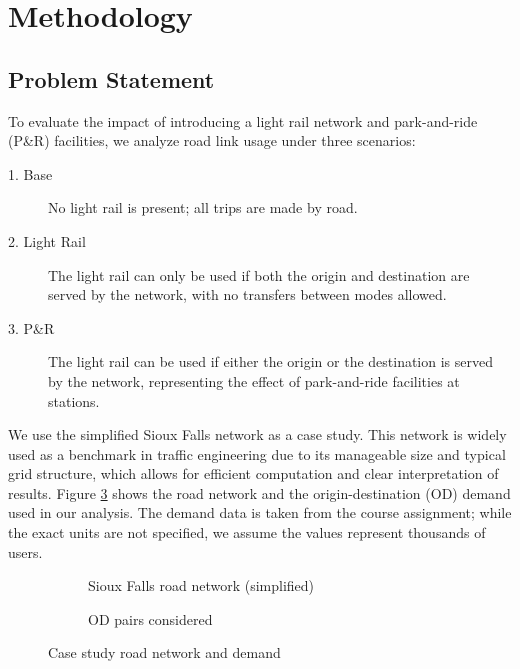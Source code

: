 \section{Methodology}

\subsection{Problem Statement}

To evaluate the impact of introducing a light rail network and park-and-ride (P\&R) facilities, we analyze road link usage under three scenarios:
\begin{description}
    \item[1. Base] No light rail is present; all trips are made by road.
    \item[2. Light Rail] The light rail can only be used if both the origin and destination are served by the network, with no transfers between modes allowed.
    \item[3. P\&R] The light rail can be used if either the origin or the destination is served by the network, representing the effect of park-and-ride facilities at stations.
\end{description}

We use the simplified Sioux Falls network as a case study. This network is widely used as a benchmark in traffic engineering due to its manageable size and typical grid structure, which allows for efficient computation and clear interpretation of results. Figure \ref{fig:casestudy} shows the road network and the origin-destination (OD) demand used in our analysis. The demand data is taken from the course assignment; while the exact units are not specified, we assume the values represent thousands of users.

\begin{figure}
    \centering
    \begin{subfigure}{0.5\textwidth}
        \centering
        \resizebox{\textwidth}{!}{}
        \caption{Sioux Falls road network (simplified)}
        \label{fig:sf_network}
    \end{subfigure}%
    \begin{subfigure}{0.5\textwidth}
        \centering
        \resizebox{\textwidth}{!}{}
        \caption{OD pairs considered}
        \label{fig:od_paires}
    \end{subfigure}
    \caption{Case study road network and demand}
    \label{fig:casestudy}
\end{figure}

